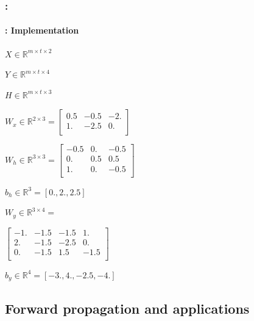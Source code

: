 \documentclass[xcolor=table]{beamer}
\begin{document}
\begin{frame}
	\frametitle{\insertshortsubtitle: \insertsection}
	\framesubtitle{\insertsubsection: Implementation}
	
	
	\begin{minipage}{0.65\textwidth}
	\end{minipage}
	\begin{minipage}{0.3\textwidth}
		\tiny
		$X \in \mathbb{R}^{m \times t \times 2} $
		
		\vskip5pt
		$ Y \in \mathbb{R}^{m \times t \times 4}$
		
		\vskip5pt
		$ H \in \mathbb{R}^{m \times t \times 3}$
		
		\vskip5pt
		$W_x \in \mathbb{R}^{2 \times 3} = 
		\begin{bmatrix}
			0.5 & -0.5 & -2. \\
			1. & -2.5 & 0.\\
		\end{bmatrix}$
		
		\vskip5pt
		$W_h \in \mathbb{R}^{3 \times 3}  = 
		\begin{bmatrix}
			-0.5 & 0. & -0.5\\
			0. & 0.5 & 0.5 \\
			1. & 0. & -0.5 \\
		\end{bmatrix}$
		
		\vskip5pt
		$b_h \in \mathbb{R}^{3} = [0., 2., 2.5]$
		
		\vskip5pt
		$W_y \in \mathbb{R}^{3 \times 4} = $
		
		$\begin{bmatrix}
			-1. & -1.5 & -1.5 & 1. \\
			2.  & -1.5 & -2.5 & 0. \\
			0.  & -1.5 & 1.5  & -1.5\\ 
		\end{bmatrix}$
		
		\vskip5pt
		$b_y \in \mathbb{R}^{4} = [-3., 4., -2.5, -4.]$
	\end{minipage}
	
\end{frame}

\subsection{Forward propagation and applications}
\end{document}
